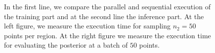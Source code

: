 \begin{figure}[ht]
\begin{center}
    \end{center}
    \caption[Execution time exploiting parallelisation]{In the first
      line, we compare the parallel and sequential execution of the
      training part and at the second line the inference part. At the
      left figure, we measure the execution time for sampling $n_2=50$
      points per region. At the right figure we measure the execution
      time for evaluating the posterior at a batch of $50$ points.}
  \label{fig:exec_parallel}
\end{figure}
